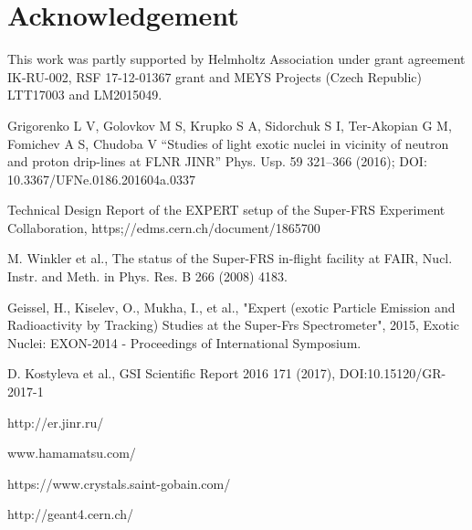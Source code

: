 \documentclass{webofc}
\begin{document}
\section{Acknowledgement}
This  work was partly supported by Helmholtz Association under grant agreement IK-RU-002, RSF 17-12-01367 grant and MEYS Projects (Czech Republic) LTT17003 and LM2015049.

	
\begin{thebibliography}{99}
	Grigorenko L V, Golovkov M S, Krupko S A, Sidorchuk S I, Ter-Akopian G M, Fomichev A S, Chudoba V “Studies of light exotic nuclei in vicinity of neutron and proton drip-lines at FLNR JINR” Phys. Usp. 59 321–366 (2016); DOI: 10.3367/UFNe.0186.201604a.0337
	
	
	Technical Design Report of the EXPERT setup of the Super-FRS Experiment Collaboration, https;//edms.cern.ch/document/1865700
	
	M. Winkler et al., The status of the Super-FRS in-flight facility at FAIR, Nucl. Instr. and Meth. in Phys. Res. B 266 (2008) 4183.
	
	Geissel, H., Kiselev, O., Mukha, I., et al., "Expert (exotic Particle Emission and Radioactivity by Tracking) Studies at the Super-Frs Spectrometer", 2015, Exotic Nuclei: EXON-2014 - Proceedings of International Symposium.
	
	D. Kostyleva et al., GSI Scientific Report 2016 171 (2017), DOI:10.15120/GR-2017-1
	
	http://er.jinr.ru/
	
	www.hamamatsu.com/
	
	https://www.crystals.saint-gobain.com/
	
	http://geant4.cern.ch/
	
	
\end{thebibliography}
\end{document}
